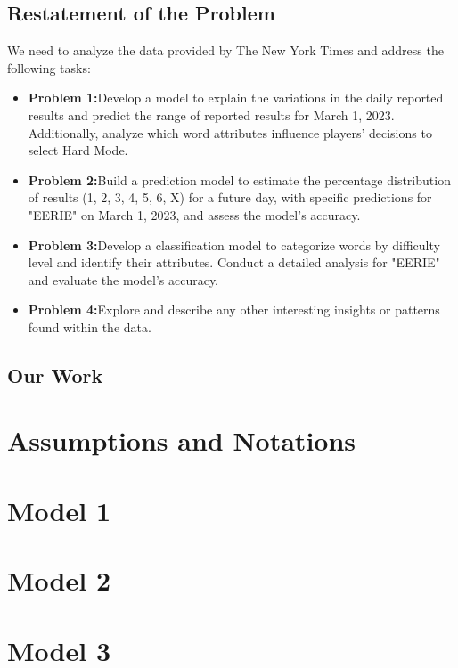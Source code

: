 \documentclass{mcmthesis}  %
\begin{document}
\subsection{Restatement of the Problem}

We need to analyze the data provided by The New York Times and address the following tasks:
\begin{itemize}  %
        \item \textbf{Problem 1:}Develop a model to explain the variations in the daily reported results and predict the 
        range of reported results for March 1, 2023. Additionally, analyze which word attributes influence 
        players' decisions to select Hard Mode.
        \item \textbf{Problem 2:}Build a prediction model to estimate the percentage distribution of results (1, 2, 3, 4, 5, 6, X) 
        for a future day, with specific predictions for "EERIE" on March 1, 2023, and assess the model's accuracy.
        \item \textbf{Problem 3:}Develop a classification model to categorize words by difficulty level and identify their attributes. 
        Conduct a detailed analysis for "EERIE" and evaluate the model's accuracy.
        \item \textbf{Problem 4:}Explore and describe any other interesting insights or patterns found within the data.
\end{itemize}  %

\subsection{Our Work}

\section{Assumptions and Notations}  %

\section{Model 1}  %

\section{Model 2}  %

\section{Model 3}  %
\end{document}
